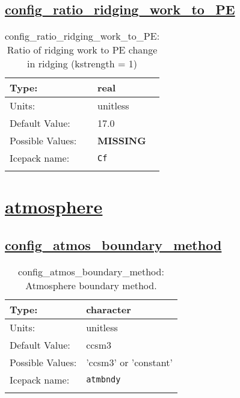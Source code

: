 \subsection[config\_ratio\_ridging\_work\_to\_PE]{\hyperref[sec:nm_tab_ridging]{config\_ratio\_ridging\_work\_to\_PE}}
\label{subsec:nm_sec_config_ratio_ridging_work_to_PE}
\begin{center}
\begin{longtable}{| p{2.0in} || p{4.0in} |}
    \hline
    Type: & real \\
    \hline
    Units: & \si{unitless} \\
    \hline
    Default Value: & 17.0 \\
    \hline
    Possible Values: & {\bf \color{red} MISSING} \\
    \hline
    Icepack name: & \verb+Cf+ \\
    \hline
    \caption{config\_ratio\_ridging\_work\_to\_PE: Ratio of ridging work to PE change in ridging (kstrength = 1)}
\end{longtable}
\end{center}
\section[atmosphere]{\hyperref[sec:nm_tab_atmosphere]{atmosphere}}
\label{sec:nm_sec_atmosphere}
\subsection[config\_atmos\_boundary\_method]{\hyperref[sec:nm_tab_atmosphere]{config\_atmos\_boundary\_method}}
\label{subsec:nm_sec_config_atmos_boundary_method}
\begin{center}
\begin{longtable}{| p{2.0in} || p{4.0in} |}
    \hline
    Type: & character \\
    \hline
    Units: & \si{unitless} \\
    \hline
    Default Value: & ccsm3 \\
    \hline
    Possible Values: & 'ccsm3' or 'constant' \\
    \hline
    Icepack name: & \verb+atmbndy+ \\
    \hline
    \caption{config\_atmos\_boundary\_method: Atmosphere boundary method.}
\end{longtable}
\end{center}
